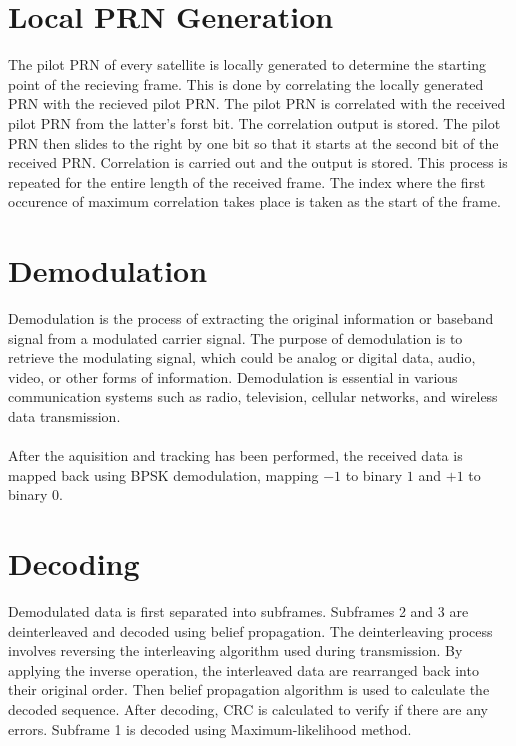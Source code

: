 \section{Local PRN Generation}
The pilot PRN of every satellite is locally generated to determine the starting point of the recieving frame. This is done by correlating the locally generated PRN with the recieved pilot PRN. The pilot PRN is correlated with the received pilot PRN from the latter's forst bit. The correlation output is stored. The pilot PRN then slides to the right by one bit so that it starts at the second bit of the received PRN. Correlation is carried out and the output is stored. This process is repeated for the entire length of the received frame. The index where the first occurence of maximum correlation takes place is taken as the start of the frame.


\section{Demodulation}
Demodulation is the process of extracting the original information or baseband signal from a modulated carrier signal. The purpose of demodulation is to retrieve the modulating signal, which could be analog or digital data, audio, video, or other forms of information. Demodulation is essential in various communication systems such as radio, television, cellular networks, and wireless data transmission.
\\
\\
After the aquisition and tracking has been performed, the received data is mapped back using BPSK demodulation, mapping $-1$ to binary $1$ and $+1$ to binary $0$.
\section{Decoding}
Demodulated data is first separated into subframes. Subframes 2 and 3 are deinterleaved and decoded using belief propagation. The deinterleaving process involves reversing the interleaving algorithm used during transmission. By applying the inverse operation, the interleaved data are rearranged back into their original order. Then belief propagation algorithm is used to calculate the decoded sequence. After decoding, CRC is calculated to verify if there are any errors. Subframe 1 is decoded using Maximum-likelihood method.
